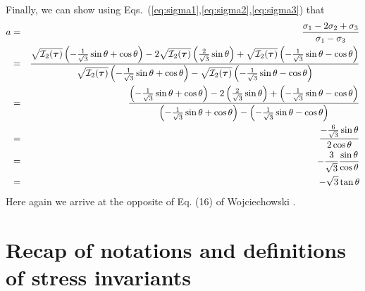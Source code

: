 Finally, we can show using Eqs.~(\ref{eq:sigma1},\ref{eq:sigma2},\ref{eq:sigma3}) that
\begin{eqnarray}
a 
&=&\frac{\sigma_1-2\sigma_2+\sigma_3}{\sigma_1-\sigma_3} \nonumber\\
&=& 
\frac{
\sqrt{{\cal I}_2({\bm \tau})} \left(-\frac{1}{\sqrt{3}}\sin \theta +\cos\theta \right) 
-2
\sqrt{{\cal I}_2({\bm \tau})} \left(\frac{2}{\sqrt{3}}\sin \theta   \right)   
+
\sqrt{{\cal I}_2({\bm \tau})} \left(-\frac{1}{\sqrt{3}}\sin \theta- \cos \theta \right)  
}{
\sqrt{{\cal I}_2({\bm \tau})} \left(-\frac{1}{\sqrt{3}}\sin \theta +\cos\theta \right)
- 
\sqrt{{\cal I}_2({\bm \tau})} \left(-\frac{1}{\sqrt{3}}\sin \theta- \cos \theta \right)  
}
\nonumber \\
&=& 
\frac{
\left(-\frac{1}{\sqrt{3}}\sin \theta +\cos\theta \right) 
-2
\left(\frac{2}{\sqrt{3}}\sin \theta   \right)   
+
\left(-\frac{1}{\sqrt{3}}\sin \theta- \cos \theta \right)  
}{
\left(-\frac{1}{\sqrt{3}}\sin \theta +\cos\theta \right)
- 
\left(-\frac{1}{\sqrt{3}}\sin \theta- \cos \theta \right)  
}
\nonumber \\
&=& 
\frac{
-\frac{6}{\sqrt{3}}\sin \theta  
}
{
2\cos\theta
}
\nonumber\\
&=& -\frac{3}{\sqrt{3}} \frac{\sin\theta}{\cos\theta} \nonumber\\
&=& -\sqrt{3} \tan\theta
\end{eqnarray}
Here again we arrive at the opposite of Eq. (16) of Wojciechowski \cite{wojc18}. 

\newpage

\section{Recap of notations and definitions of stress invariants \label{ss:recapInv}}

























